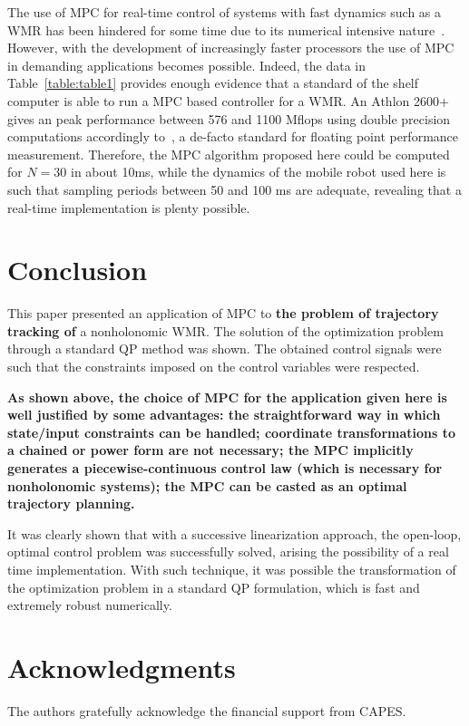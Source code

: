 \documentclass[conference]{IEEEtran} %
\begin{document}
The use of MPC for real-time control of systems with fast dynamics such as a
WMR has been hindered for some time due to its numerical intensive
nature~\cite{cannon00}. However, with the development of increasingly faster
processors the use of MPC in demanding applications becomes possible.
Indeed, the data in Table~\ref{table:table1} provides enough evidence that a
standard of the shelf computer is able to run a MPC based controller for a
WMR. An Athlon 2600+ gives an peak performance between 576 and 1100 Mflops
using double precision computations accordingly
to~\cite{aburto:flops-1992-dec}, a de-facto standard for floating point
performance measurement. Therefore, the MPC algorithm proposed here could be
computed for $N=30$ in about 10ms, while the dynamics of the mobile robot
used here is such that sampling periods between 50 and 100 ms are adequate,
revealing that a real-time implementation is plenty possible.


\section{Conclusion}
\label{sec:conclusions}

This paper presented an application of MPC to {\bf the problem of trajectory tracking of} a nonholonomic WMR. The
solution of the optimization problem through a standard QP method was shown.
The obtained control signals were such that the constraints imposed on the
control variables were respected. 

{\bf As shown above, the choice of MPC for the application given here is well justified by some advantages: the straightforward way in which state/input constraints can be handled; coordinate transformations to a chained or power form are not necessary; the MPC implicitly generates a piecewise-continuous control law (which is necessary for nonholonomic systems); the MPC can be casted as an optimal trajectory planning.

It was clearly shown that with a successive linearization approach, the open-loop, optimal control problem was successfully solved, arising the possibility of a real time implementation. With such technique, it was possible the transformation of the optimization problem in a standard QP formulation, which is fast and extremely robust numerically.}


\section*{Acknowledgments}

The authors gratefully acknowledge the financial support from CAPES.



\end{document}
